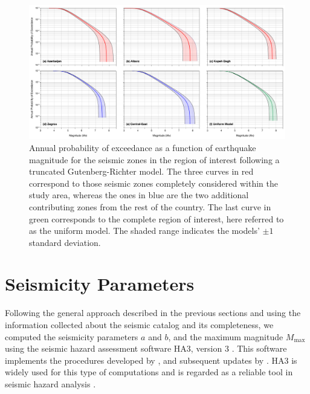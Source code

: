\begin{figure}[t]
    \centering
    \includegraphics[width=\textwidth]{figures/pdf/figure-07}
    \caption{Annual probability of exceedance as a function of earthquake magnitude for the seismic zones in the region of interest following a truncated Gutenberg-Richter model. The three curves in red correspond to those seismic zones completely considered within the study area, whereas the ones in blue are the two additional contributing zones from the rest of the country. The last curve in green corresponds to the complete region of interest, here referred to as the uniform model. The shaded range indicates the models' $\pm 1$ standard deviation.}
    \label{fig:annualp}
\end{figure}

\section{Seismicity Parameters}
\label{sec:params}

Following the general approach described in the previous sections and using the information collected about the seismic catalog and its completeness, we computed the seismicity parameters $a$ and $b$, and the maximum magnitude $M_{\max}$ using the seismic hazard assessment software HA3, version 3 \citep{Kijko_2004_HA3}. This software implements the procedures developed by \citet{Kijko_1989_BSSA, Kijko_1992_BSSA}, and subsequent updates by \citet{Kijko_2004_PAG}. HA3 is widely used for this type of computations and is regarded as a reliable tool in seismic hazard analysis \citep[see, for instance,][]{Karimiparidari2013, Khodaverdian_2016_BSSA}.

